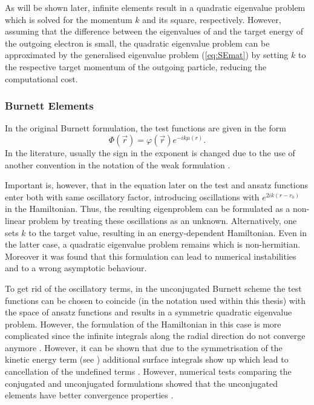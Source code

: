 As will be shown later, infinite elements result in a quadratic eigenvalue problem which is solved for the momentum $k$ and its square, respectively.
However, assuming that the difference between the eigenvalues of  and the target energy of the outgoing electron is small, the quadratic eigenvalue problem can be approximated by the generalised eigenvalue problem (\ref{eq:SEmat}) by setting $k$ to the respective target momentum of the outgoing particle, reducing the computational cost.

\subsubsection{Burnett Elements}
In the original Burnett formulation, the test functions are given in the form
\begin{equation} \label{eq:BUelem}
 \Phi(\vec{r}) = \varphi(\vec{r}) e^{-ik\mu(r)}.
\end{equation}
In the literature, usually the sign in the exponent is changed due to the use of another convention in the notation of the weak formulation .

Important is, however, that in the equation later on the test and ansatz functions enter both with same oscillatory factor, introducing oscillations with $e^{2ik(r-r_0)}$ in the Hamiltonian.
Thus, the resulting eigenproblem can be formulated as a non-linear problem by treating these oscillations as an unknown.
Alternatively, one sets $k$ to the target value, resulting in an energy-dependent Hamiltonian.
Even in the latter case, a quadratic eigenvalue problem remains which is non-hermitian.
Moreover it was found that this formulation can lead to numerical instabilities \cite{Astley} and to a wrong asymptotic behaviour.

To get rid of the oscillatory terms, in the unconjugated Burnett scheme the test functions can be chosen to coincide (in the notation used within this thesis) with the space of ansatz functions  and results in a symmetric quadratic eigenvalue problem.
However, the formulation of the Hamiltonian in this case is more complicated since the infinite integrals along the radial direction do not converge anymore \cite{Astley,gerdes}.
However, it can be shown that due to the symmetrisation of the kinetic energy term (see ) additional surface integrals show up which lead to cancellation of the undefined terms \cite{gerdes}.
However, numerical tests comparing the conjugated and unconjugated formulations showed that the unconjugated elements  have better convergence properties \cite{gerdes}.
%


